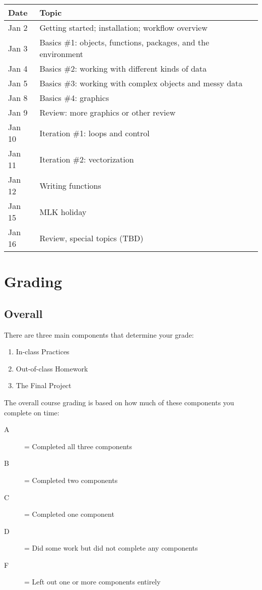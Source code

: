 \documentclass[11pt]{tufte-handout}
\begin{document}
\begin{center}
\begin{tabular}{ll}
Date & Topic\\
\hline
Jan 2 & Getting started; installation; workflow overview\\
Jan 3 & Basics \#1: objects, functions, packages, and the environment\\
Jan 4 & Basics \#2: working with different kinds of data\\
Jan 5 & Basics \#3: working with complex objects and messy data\\
Jan 8 & Basics \#4: graphics\\
Jan 9 & Review: more graphics or other review\\
Jan 10 & Iteration \#1: loops and control\\
Jan 11 & Iteration \#2: vectorization\\
Jan 12 & Writing functions\\
Jan 15 & MLK holiday\\
Jan 16 & Review, special topics (TBD)\\
\end{tabular}
\end{center}

\section*{Grading}
\label{sec-6}
\subsection*{Overall}
\label{sec-6-1}
There are three main components that determine your grade:
\begin{enumerate}
\item In-class Practices
\item Out-of-class Homework
\item The Final Project
\end{enumerate}

The overall course grading is based on how much of these components you complete on time:
\begin{description}
\item[{A}] = Completed all three components
\item[{B}] = Completed two components
\item[{C}] = Completed one component
\item[{D}] = Did some work but did not complete any components
\item[{F}] = Left out one or more components entirely
\end{description}
\end{document}
